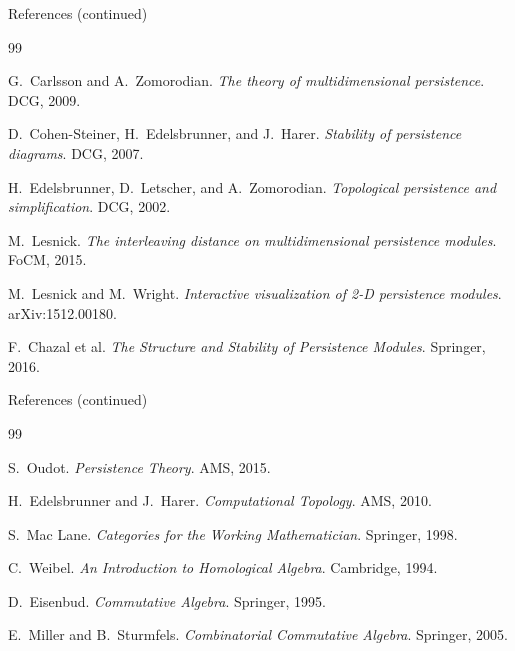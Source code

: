 \documentclass[aspectratio=169,11pt]{beamer}
\begin{document}
\begin{frame}{References (continued)}
	\tiny
	\begin{thebibliography}{99}
		
		G.~Carlsson and A.~Zomorodian.
		\newblock \emph{The theory of multidimensional persistence}.
		\newblock DCG, 2009.
		
		D.~Cohen-Steiner, H.~Edelsbrunner, and J.~Harer.
		\newblock \emph{Stability of persistence diagrams}.
		\newblock DCG, 2007.
		
		H.~Edelsbrunner, D.~Letscher, and A.~Zomorodian.
		\newblock \emph{Topological persistence and simplification}.
		\newblock DCG, 2002.
		
		M.~Lesnick.
		\newblock \emph{The interleaving distance on multidimensional persistence modules}.
		\newblock FoCM, 2015.
		
		M.~Lesnick and M.~Wright.
		\newblock \emph{Interactive visualization of 2-D persistence modules}.
		\newblock arXiv:1512.00180.
		
		F.~Chazal et al.
		\newblock \emph{The Structure and Stability of Persistence Modules}.
		\newblock Springer, 2016.
		
	\end{thebibliography}
\end{frame}

\begin{frame}{References (continued)}
	\tiny
	\begin{thebibliography}{99}
		
		S.~Oudot.
		\newblock \emph{Persistence Theory}.
		\newblock AMS, 2015.
		
		H.~Edelsbrunner and J.~Harer.
		\newblock \emph{Computational Topology}.
		\newblock AMS, 2010.
		
		S.~Mac Lane.
		\newblock \emph{Categories for the Working Mathematician}.
		\newblock Springer, 1998.
		
		C.~Weibel.
		\newblock \emph{An Introduction to Homological Algebra}.
		\newblock Cambridge, 1994.
		
		D.~Eisenbud.
		\newblock \emph{Commutative Algebra}.
		\newblock Springer, 1995.
		
		E.~Miller and B.~Sturmfels.
		\newblock \emph{Combinatorial Commutative Algebra}.
		\newblock Springer, 2005.
		
	\end{thebibliography}
\end{frame}
\end{document}
